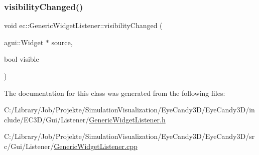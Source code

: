 \mbox{\label{classec_1_1_generic_widget_listener_a6f9e7db28e619ab8c538152972fe6c97}} 
\subsubsection{\texorpdfstring{visibility\+Changed()}{visibilityChanged()}}
{\footnotesize\ttfamily void ec\+::\+Generic\+Widget\+Listener\+::visibility\+Changed (\begin{DoxyParamCaption}\item[{agui\+::\+Widget $\ast$}]{source,  }\item[{bool}]{visible }\end{DoxyParamCaption})\hspace{0.3cm}{\ttfamily [override]}}



The documentation for this class was generated from the following files\+:\begin{DoxyCompactItemize}
\item 
C\+:/\+Library/\+Job/\+Projekte/\+Simulation\+Visualization/\+Eye\+Candy3\+D/\+Eye\+Candy3\+D/include/\+E\+C3\+D/\+Gui/\+Listener/\mbox{\hyperlink{_generic_widget_listener_8h}{Generic\+Widget\+Listener.\+h}}\item 
C\+:/\+Library/\+Job/\+Projekte/\+Simulation\+Visualization/\+Eye\+Candy3\+D/\+Eye\+Candy3\+D/src/\+Gui/\+Listener/\mbox{\hyperlink{_generic_widget_listener_8cpp}{Generic\+Widget\+Listener.\+cpp}}\end{DoxyCompactItemize}
